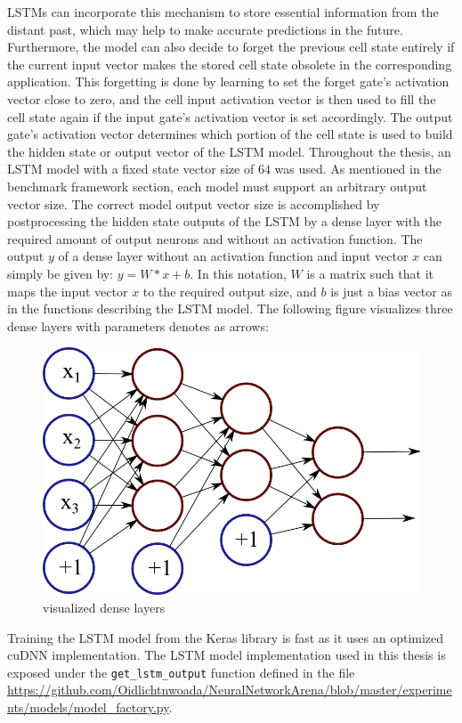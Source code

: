 \documentclass[draft,final]{vutinfth} %
\begin{document}
LSTMs can incorporate this mechanism to store essential information from the distant past, which may help to make accurate predictions in the future.
Furthermore, the model can also decide to forget the previous cell state entirely if the current input vector makes the stored cell state obsolete in the corresponding application.
This forgetting is done by learning to set the forget gate's activation vector close to zero, and the cell input activation vector is then used to fill the cell state again if the input gate's activation vector is set accordingly.
The output gate's activation vector determines which portion of the cell state is used to build the hidden state or output vector of the LSTM model.
Throughout the thesis, an LSTM model with a fixed state vector size of $64$ was used. As mentioned in the benchmark framework section, each model must support an arbitrary output vector size.
The correct model output vector size is accomplished by postprocessing the hidden state outputs of the LSTM by a dense layer with the required amount of output neurons and without an activation function.
The output $y$ of a dense layer without an activation function and input vector $x$ can simply be given by: $y = W*x + b$.
In this notation, $W$ is a matrix such that it maps the input vector $x$ to the required output size, and $b$ is just a bias vector as in the functions describing the LSTM model.
The following figure visualizes three dense layers with parameters denotes as arrows:
\begin{figure}[H]
\centering{}
\includegraphics[width=0.5\linewidth]{graphics/dense.png}
\caption{visualized dense layers \cite{dense_vis}}
\label{fig:lstm_vis}
\end{figure}
Training the LSTM model from the Keras library is fast as it uses an optimized cuDNN \cite{cuDNN} implementation.
The LSTM model implementation used in this thesis is exposed under the \texttt{get\_lstm\_output} function defined in the file \url{https://github.com/Oidlichtnwoada/NeuralNetworkArena/blob/master/experiments/models/model_factory.py}.
\end{document}
